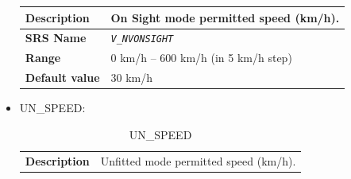 \documentclass{template/openetcs}
\begin{document}
\begin{itemize}
\begin{longtable}{|l|l|}
					\begin{minipage}[t]{0.22\linewidth} \textbf{Description}	\end{minipage} 
				&	\begin{minipage}[t]{0.78\linewidth} On Sight mode permitted speed (km/h). \end{minipage} \\
				
				\hline
				
					\begin{minipage}[t]{0.22\linewidth} \textbf{SRS Name}	\end{minipage} 
				&	\begin{minipage}[t]{0.78\linewidth} \emph{\texttt{V\_NVONSIGHT}} \end{minipage} \\
				
				\hline
														
					\begin{minipage}[t]{0.22\linewidth} \textbf{Range}	\end{minipage} 
				&	\begin{minipage}[t]{0.78\linewidth} 0 km/h – 600 km/h (in 5 km/h step) \end{minipage} \\
				
				\hline
										
					\begin{minipage}[t]{0.22\linewidth} \textbf{Default value}	\end{minipage} 
				&	\begin{minipage}[t]{0.78\linewidth} 30 km/h \end{minipage} \\
				
				\hline
				
			\end{longtable}			 
			
		\item UN\_SPEED:
			\begin{longtable}{|l|l|}
				\caption{UN\_SPEED}\\ 										
				\hline
				
					\begin{minipage}[t]{0.22\linewidth} \textbf{Description}	\end{minipage} 
				&	\begin{minipage}[t]{0.78\linewidth} Unfitted mode permitted speed (km/h). \end{minipage} \\
				

\end{longtable}
\end{itemize}
\end{document}
